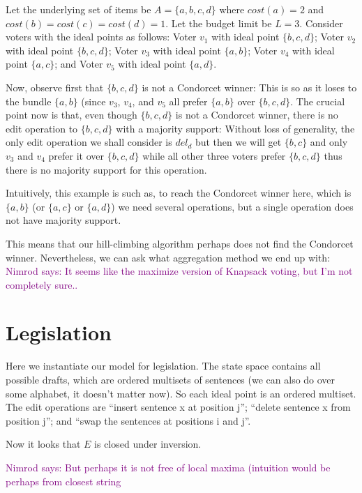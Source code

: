 \documentclass{llncs}
\newcommand{\nimrod}[1]{\textcolor{purple}{Nimrod says: #1}}
\begin{document}
\begin{example}
%
Let the underlying set of items be $A = \{a, b, c, d\}$ where $cost(a) = 2$ and $cost(b) = cost(c) = cost(d) = 1$. Let the budget limit be $L = 3$.
Consider voters with the ideal points as follows:
  Voter $v_1$ with ideal point $\{b,c,d\}$;
  Voter $v_2$ with ideal point $\{b,c,d\}$;
  Voter $v_3$ with ideal point $\{a,b\}$;
  Voter $v_4$ with ideal point $\{a,c\}$;
  and Voter $v_5$ with ideal point $\{a,d\}$.

Now, observe first that $\{b,c,d\}$ is not a Condorcet winner:
  This is so as it loses to the bundle $\{a,b\}$ (since $v_3$, $v_4$, and $v_5$ all prefer $\{a,b\}$ over $\{b,c,d\}$.
The crucial point now is that, even though $\{b,c,d\}$ is not a Condorcet winner,
there is no edit operation to $\{b,c,d\}$ with a majority support:
  Without loss of generality, the only edit operation we shall consider is $del_d$ but then we will get $\{b,c\}$ and only $v_3$ and $v_4$ prefer it over $\{b,c,d\}$ while all other three voters prefer $\{b,c,d\}$ thus there is no majority support for this operation.

Intuitively, this example is such as, to reach the Condorcet winner here, which is $\{a,b\}$ (or $\{a,c\}$ or $\{a,d\}$) we need several operations, but a single operation does not have majority support.
%
\end{example}

This means that our hill-climbing algorithm perhaps does not find the Condorcet winner.
Nevertheless, we can ask what aggregation method we end up with:
  \nimrod{It seems like the maximize version of Knapsack voting, but I'm not completely sure..}


\section{Legislation}

Here we instantiate our model for legislation.
The state space contains all possible drafts, which are ordered multisets of sentences (we can also do over some alphabet, it doesn't matter now). So each ideal point is an ordered multiset. The edit operations are ``insert sentence x at position j''; ``delete sentence x from position j''; and ``swap the sentences at positions i and j''.

Now it looks that $E$ is closed under inversion.

\nimrod{%
But perhaps it is not free of local maxima (intuition would be perhaps from closest string}
\end{document}
